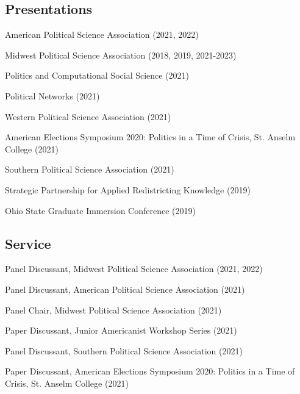 \documentclass[letterpaper]{article}
\renewenvironment{itemize}{
  \begin{list}{}{
    \setlength{\leftmargin}{1.5em}
  }
}{
  \end{list}
}
\begin{document}
\subsection*{Presentations}
\begin{itemize}

\item American Political Science Association (2021, 2022)

\item Midwest Political Science Association (2018, 2019, 2021-2023)

\item Politics and Computational Social Science (2021)

\item Political Networks (2021)

\item Western Political Science Association (2021)

\item American Elections Symposium 2020: Politics in a Time of Crisis, St. Anselm College (2021)

\item Southern Political Science Association (2021)

\item Strategic Partnership for Applied Redistricting Knowledge (2019)

\item Ohio State Graduate Immersion Conference (2019)
\end{itemize}

\subsection*{Service}
\begin{itemize}

\item Panel Discussant, Midwest Political Science Association (2021, 2022)

\item Panel Discussant, American Political Science Association (2021)

\item Panel Chair, Midwest Political Science Association (2021)

\item Paper Discussant, Junior Americanist Workshop Series (2021)

\item Panel Discussant, Southern Political Science Association (2021)

\item Paper Discussant, American Elections Symposium 2020: Politics in a Time of Crisis, St. Anselm College (2021)

\end{itemize}
\end{document}
